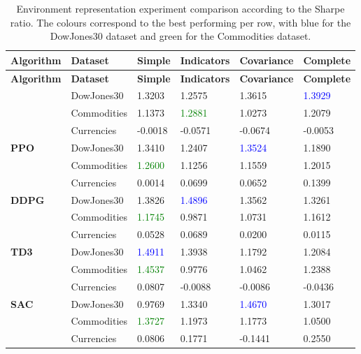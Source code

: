 \begin{longtable}{|p{2cm}|p{2.2cm}|p{2cm}|p{2cm}|p{2.2cm}|p{2cm}|}
    \caption{Environment representation experiment comparison according to the Sharpe ratio. The colours correspond to the best performing per row, with blue for the DowJones30 dataset and green for the Commodities dataset.}
    \label{tab:experiment_environment_sharpe}
    \\ 
    \hline
    \textbf{Algorithm} & \textbf{Dataset} & \textbf{Simple} & \textbf{Indicators} & \textbf{Covariance} & \textbf{Complete} \\ \midrule
    \endfirsthead

    \hline
    \textbf{Algorithm} & \textbf{Dataset} & \textbf{Simple} & \textbf{Indicators} & \textbf{Covariance} & \textbf{Complete}  \\ \midrule
    \endhead

    \endfoot

    \hline  
    \multirow{3}{*}{\textbf{A2C}}
    & DowJones30 & 1.3203 & 1.2575 & 1.3615 & \textcolor{blue}{1.3929} \\ \cline{2-6}
    & Commodities & 1.1373 & \textcolor{green}{1.2881} & 1.0273 & 1.2079 \\ \cline{2-6}
    & Currencies & -0.0018 & -0.0571 & -0.0674 & -0.0053 \\ \midrule

    \multirow{3}{*}{\textbf{PPO}}
    & DowJones30 & 1.3410 & 1.2407 & \textcolor{blue}{1.3524} & 1.1890 \\ \cline{2-6}
    & Commodities & \textcolor{green}{1.2600} & 1.1256 & 1.1559 & 1.2015 \\ \cline{2-6}
    & Currencies & 0.0014 & 0.0699 & 0.0652 & 0.1399 \\ \midrule

    \multirow{3}{*}{\textbf{DDPG}}
    & DowJones30 & 1.3826 & \textcolor{blue}{1.4896} & 1.3562 & 1.3261 \\ \cline{2-6}
    & Commodities & \textcolor{green}{1.1745} & 0.9871 & 1.0731 & 1.1612 \\ \cline{2-6}
    & Currencies & 0.0528 & 0.0689 & 0.0200 & 0.0115 \\ \midrule

    \multirow{3}{*}{\textbf{TD3}}
    & DowJones30 & \textcolor{blue}{1.4911} & 1.3938 & 1.1792 & 1.2084 \\ \cline{2-6}
    & Commodities & \textcolor{green}{1.4537} & 0.9776 & 1.0462 & 1.2388 \\ \cline{2-6}
    & Currencies & 0.0807 & -0.0088 & -0.0086 & -0.0436 \\ \midrule

    \multirow{3}{*}{\textbf{SAC}}
    & DowJones30 & 0.9769 & 1.3340 & \textcolor{blue}{1.4670} & 1.3017 \\ \cline{2-6}
    & Commodities & \textcolor{green}{1.3727} & 1.1973 & 1.1773 & 1.0500 \\ \cline{2-6}
    & Currencies & 0.0806 & 0.1771 & -0.1441 & 0.2550 \\ \midrule

\end{longtable}